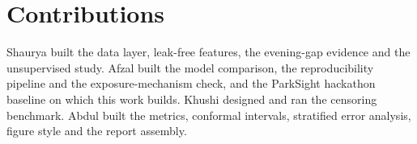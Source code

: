 \documentclass[conference]{IEEEtran}
\begin{document}
\section*{Contributions}
Shaurya built the data layer, leak-free features, the evening-gap evidence and the unsupervised study. Afzal built the model comparison, the reproducibility pipeline and the exposure-mechanism check, and the ParkSight hackathon baseline on which this work builds. Khushi designed and ran the censoring benchmark. Abdul built the metrics, conformal intervals, stratified error analysis, figure style and the report assembly.



\end{document}

